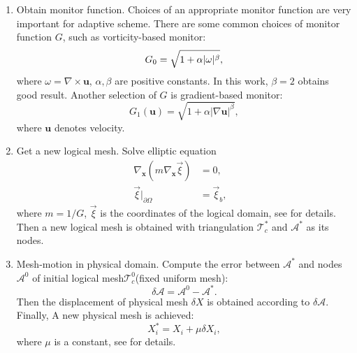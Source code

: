 \documentclass[mathpazo]{aamm}
\begin{document}
   \begin{enumerate}[step 1]
   \item Obtain monitor function.
     Choices of an appropriate monitor function are very important for
     adaptive scheme.  There are some
     common choices of monitor function $G$, such as vorticity-based monitor: 
     \begin{equation}
       \centering
       G_0 = \sqrt{1 + \alpha |\omega|^\beta},
       \label{eq::monitor_vorticity}
     \end{equation}
     where $\omega = \nabla \times \mathbf{u}$, $\alpha, \beta$
     are positive constants. In this work, $\beta = 2$ obtains
     good result. Another selection of $G$ is gradient-based monitor:
     \begin{equation}
       G_1(\mathbf{u}) = \sqrt{1 + \alpha |\nabla \mathbf{u}|^\beta},
       \label{eq::monitor_gradient}
     \end{equation}
     where $\mathbf{u}$ denotes velocity.
   \item Get a new logical mesh. Solve elliptic equation 
     \begin{eqnarray}
       \nabla_{\mathbf{x}}(m \nabla_{\mathbf{x}} \vec{\xi}) &= 0,&\\
       \vec{\xi}|_{\partial \Omega} &= \vec{\xi}_b,&
       \label{eq::logical}
     \end{eqnarray}
     where $m = 1/G$, $\vec{\xi}$ is the coordinates of the logical
     domain, see \cite{li2001mesh} for details. Then a new logical mesh is obtained with triangulation
     $\mathcal{T}_c^*$ and $\mathcal{A}^*$ as its nodes. 

   \item Mesh-motion in physical domain.
     Compute the error between $\mathcal{A}^*$ and nodes
     $\mathcal{A}^0$ of initial logical
     mesh$\mathcal{T}_c^0$(fixed uniform mesh):
     \begin{equation}
       \delta \mathcal{A} = \mathcal{A}^0 - \mathcal{A}^*.
     \end{equation}
     Then the displacement of physical mesh $\delta X$ is obtained
     according to $\delta \mathcal{A}$. Finally, A new physical mesh is
     achieved:
     \begin{equation}
       X_i^* = X_i + \mu \delta X_i,
     \end{equation}
     where $\mu$ is a constant, see \cite{di2005moving} for details.
     

\end{enumerate}
\end{document}
